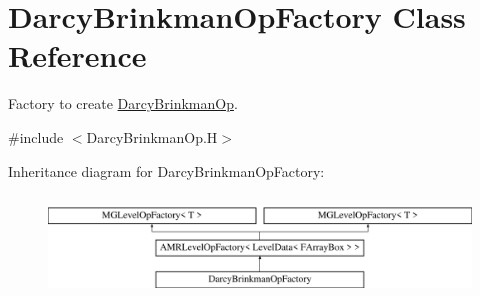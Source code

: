 \hypertarget{class_darcy_brinkman_op_factory}{}\section{Darcy\+Brinkman\+Op\+Factory Class Reference}
\label{class_darcy_brinkman_op_factory}


Factory to create \hyperlink{class_darcy_brinkman_op}{Darcy\+Brinkman\+Op}.  




{\ttfamily \#include $<$Darcy\+Brinkman\+Op.\+H$>$}

Inheritance diagram for Darcy\+Brinkman\+Op\+Factory\+:\begin{figure}[H]
\begin{center}
\leavevmode
\includegraphics[height=2.736156cm]{class_darcy_brinkman_op_factory}
\end{center}
\end{figure}
